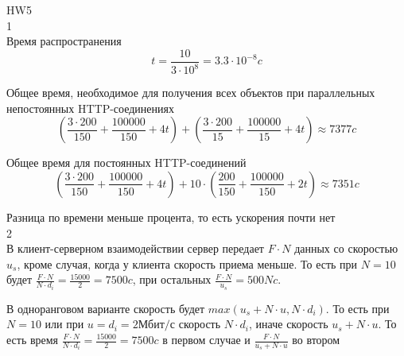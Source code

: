 \documentclass[a4paper,11pt]{article}
\begin{document}
\Large
HW5 
\\
1
\\

Время распространения 
$$t = \frac{10}{3 \cdot 10^8} = 3.3 \cdot 10^{-8} c$$ 

Общее время, необходимое для получения всех объектов при параллельных непостоянных HTTP-соединениях
$$(\frac{3 \cdot 200}{150} + \frac{100000}{150} + 4 t) + (\frac{3 \cdot 200}{15} + \frac{100000}{15} + 4 t) \approx 7377 c$$

Общее время для постоянных HTTP-соединений
$$(\frac{3 \cdot 200}{150} + \frac{100000}{150} + 4 t) + 10 \cdot (\frac{200}{150} + \frac{100000}{150} + 2 t) \approx 7351 c$$

Разница по времени меньше процента, то есть ускорения почти нет
\\
2
\\

В клиент-серверном взаимодействии сервер передает $F \cdot N$ данных со скоростью $u_s$, кроме случая, когда у клиента скорость приема меньше. То есть при $N = 10$ будет $\frac{F \cdot N}{N \cdot d_i} = \frac{15000}{2} = 7500 c$, при остальных $\frac{F \cdot N}{u_s} = 500 N c$.



В одноранговом варианте скорость будет $max(u_s + N \cdot u, N \cdot d_i)$. То есть при $N = 10$ или при $u = d_i = 2Мбит/с$ скорость $N \cdot d_i$, иначе скорость $u_s + N \cdot u$. То есть время $\frac{F \cdot N}{N \cdot d_i} = \frac{15000}{2} = 7500 c$ в первом случае и $\frac{F \cdot N}{u_s + N \cdot u}$ во втором

\end{document}
